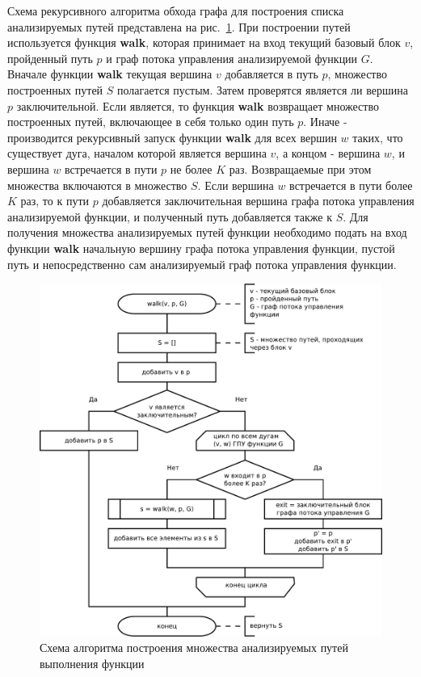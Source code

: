 Схема рекурсивного алгоритма обхода графа для построения списка анализируемых путей представлена на рис.~\ref{fig:build-pathes}. При построении путей используется функция \textbf{walk}, которая принимает на вход текущий базовый блок $v$, пройденный путь $p$ и граф потока управления анализируемой функции $G$. Вначале функции \textbf{walk} текущая вершина $v$ добавляется в путь $p$, множество построенных путей $S$ полагается пустым. Затем проверятся является ли вершина $p$ заключительной. Если является, то функция \textbf{walk} возвращает множество построенных путей, включающее в себя только один путь $p$. Иначе - производится рекурсивный запуск функции \textbf{walk} для всех вершин $w$ таких, что существует дуга, началом которой является вершина $v$, а концом - вершина $w$, и вершина $w$ встречается в пути $p$ не более $K$ раз. Возвращаемые при этом  множества включаются в множество $S$. Если вершина $w$ встречается в пути более $K$ раз, то к пути $p$ добавляется заключительная вершина графа потока управления анализируемой функции, и полученный путь добавляется также к $S$. Для получения множества анализируемых путей функции необходимо подать на вход функции \textbf{walk} начальную вершину графа потока управления функции, пустой путь и непосредственно сам анализируемый граф потока управления функции.

\begin{figure}
  \centering
  \includegraphics[width=\textwidth]{inc/dia/build-pathes}
  \caption{Схема алгоритма построения множества анализируемых путей выполнения функции}
  \label{fig:build-pathes}
\end{figure}
 
